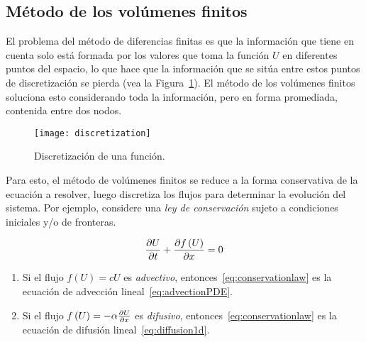\subsection{Método de los volúmenes finitos}

\begin{frame}
	El problema del método de diferencias finitas es que la información
	que tiene en cuenta solo está formada por los valores que toma la
	función $U$ en diferentes puntos del espacio, lo que hace que la
	información que se sitúa entre estos puntos de discretización se
	pierda (vea la Figura~\ref{fig:discretization}).
	El método de los volúmenes finitos soluciona esto considerando toda
	la información, pero en forma promediada, contenida entre dos nodos.

	\begin{figure}[ht!]
		\centering
		\texttt{[image: discretization]}
		\caption{Discretización de una función.}
		\label{fig:discretization}
	\end{figure}

	Para esto, el método de volúmenes finitos se reduce a la forma
	conservativa de la ecuación a resolver, luego discretiza los flujos
	para determinar la evolución del sistema.
	Por ejemplo, considere una \emph{ley de conservación} sujeto a
	condiciones iniciales y/o de fronteras.

	\begin{equation}\label{eq:conservationlaw}
		\diffp{U}{t}+
		\diffp{
			f
			\left(U\right)
		}{x}=
		0
	\end{equation}

	\begin{alertblock}\leavevmode
		\begin{enumerate}
			\item

			      Si el flujo
			      \begin{math}
				      f
				      \left(U\right)=
				      cU
			      \end{math}
			      es \emph{advectivo}, entonces~\eqref{eq:conservationlaw} es
			      la ecuación de advección lineal~\eqref{eq:advectionPDE}.

			\item


			      Si el flujo
			      \begin{math}
				      f
				      \left(U\right)=
				      -\alpha\diffp{U}{x}
			      \end{math}
			      es \emph{difusivo}, entonces~\eqref{eq:conservationlaw} es
			      la ecuación de difusión lineal~\eqref{eq:diffusion1d}.


\end{enumerate}
\end{alertblock}
\end{frame}

